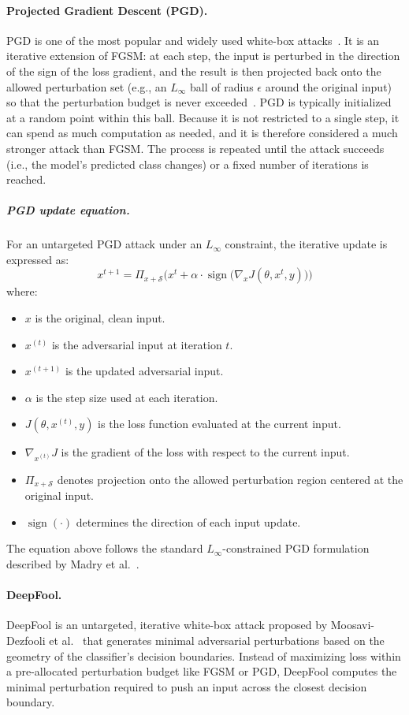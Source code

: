\documentclass[12pt]{article}
\DeclareMathOperator{\sign}{sign}
\begin{document}
\paragraph{Projected Gradient Descent (PGD).} PGD is one of the most popular and widely used white-box attacks~\cite{madry2018}. It is an iterative extension of FGSM: at each step, the input is perturbed in the direction of the sign of the loss gradient, and the result is then projected back onto the allowed perturbation set (e.g., an $L_\infty$ ball of radius $\epsilon$ around the original input) so that the perturbation budget is never exceeded~\cite{madry2018,kurakin2017}. PGD is typically initialized at a random point within this ball. Because it is not restricted to a single step, it can spend as much computation as needed, and it is therefore considered a much stronger attack than FGSM. The process is repeated until the attack succeeds (i.e., the model's predicted class changes) or a fixed number of iterations is reached.

\subparagraph{PGD update equation.} For an untargeted PGD attack under an $L_\infty$ constraint, the iterative update is expressed as:
\begin{equation}
  x^{t+1} = \Pi_{x+\mathcal{S}}\!\Big(x^{t} + \alpha \cdot \sign\!\big(\nabla_x J(\theta, x^{t}, y)\big)\Big)
\end{equation}
where:
\begin{itemize}
  \item $x$ is the original, clean input.
  \item $x^{(t)}$ is the adversarial input at iteration $t$.
  \item $x^{(t+1)}$ is the updated adversarial input.
  \item $\alpha$ is the step size used at each iteration.
  \item $J(\theta, x^{(t)}, y)$ is the loss function evaluated at the current input.
  \item $\nabla_{x^{(t)}} J$ is the gradient of the loss with respect to the current input.
  \item $\Pi_{x+\mathcal{S}}$ denotes projection onto the allowed perturbation region centered at the original input.
  \item $\sign(\cdot)$ determines the direction of each input update.
\end{itemize}
The equation above follows the standard $L_\infty$-constrained PGD formulation described by Madry et al.~\cite{madry2018}.

\paragraph{DeepFool.} DeepFool is an untargeted, iterative white-box attack proposed by Moosavi-Dezfooli et al.~\cite{moosavi2016} that generates minimal adversarial perturbations based on the geometry of the classifier's decision boundaries. Instead of maximizing loss within a pre-allocated perturbation budget like FGSM or PGD, DeepFool computes the minimal perturbation required to push an input across the closest decision boundary.
\end{document}
